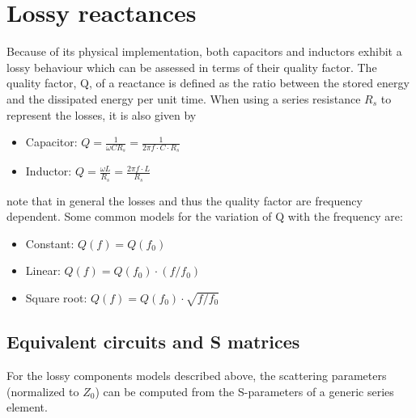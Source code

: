 \section{Lossy reactances}
Because of its physical implementation, both capacitors and inductors exhibit a lossy behaviour which can be assessed in terms of their quality factor. The quality factor, Q, of a reactance is defined as the ratio between the stored energy and the dissipated energy per unit time.
When using a series resistance $R_s$ to represent the losses, it is also given by

\begin{itemize}
\item Capacitor: $Q = \frac{1}{\omega C R_s} = \frac{1}{2 \pi f \cdot C \cdot R_s}$
\item Inductor: $Q = \frac{\omega L}{R_s} = \frac{2 \pi f \cdot L }{R_s}$
\end{itemize}

note that in general the losses and thus the quality factor are frequency dependent. Some common models for the variation of Q with the frequency are:

\begin{itemize}
\item Constant: $Q(f) = Q(f_0)$
\item Linear: $Q(f) = Q(f_0)\cdot (f/f_0)$
\item Square root: $Q(f) = Q(f_0)\cdot \sqrt{f/f_0}$
\end{itemize}


\subsection{Equivalent circuits and S matrices}

For the lossy components models described above, the scattering parameters (normalized to $Z_0$) can be computed from the S-parameters of a generic series element.

